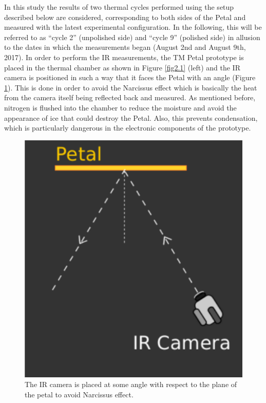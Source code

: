 		In this study the results of two thermal cycles performed using the setup described below are considered, corresponding to both sides of the Petal and measured with the latest experimental configuration. In the following, this will be referred to as “cycle 2” (unpolished side) and “cycle 9” (polished side) in allusion to the dates in which the measurements began (August 2nd and August 9th, 2017). 
		In order to perform the IR measurements, the TM Petal prototype is placed in the thermal chamber as shown in Figure \ref{fig2.1} (left) and the IR camera is positioned in such a way that it faces the Petal with an angle (Figure \ref{fig2.6}). This is done in order to avoid the Narcissus effect which is basically the heat from the camera itself being reflected back and measured.
		As mentioned before, nitrogen is flushed into the chamber to reduce the moisture and avoid the appearance of ice that could destroy the Petal. Also, this prevents condensation, which is particularly dangerous in the electronic components of the prototype.
		
		\begin{figure}[ht!]
			\centering
			\captionsetup{justification=centering,margin=2cm}
			\includegraphics[scale=0.35]{Figures/Chapter02/NarcissusEffect.pdf}
			\caption{The IR camera is placed at some angle with respect to the plane of the petal to avoid Narcissus effect.}\label{fig2.6}
		\end{figure}
		
